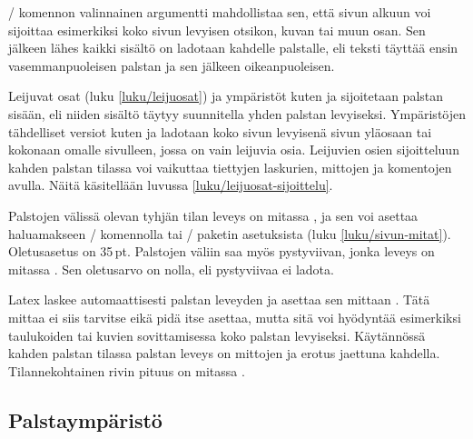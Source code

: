 \begin{koodilohkosis}
\end{koodilohkosis}

\-/ komennon valinnainen argumentti mahdollistaa sen,
että sivun alkuun voi sijoittaa esimerkiksi koko sivun levyisen otsikon,
kuvan tai muun osan. Sen jälkeen lähes kaikki sisältö on ladotaan
kahdelle palstalle, eli teksti täyttää ensin vasemmanpuoleisen palstan
ja sen jälkeen oikeanpuoleisen.

Leijuvat osat (luku \ref{luku/leijuosat}) ja ympäristöt kuten
 ja  sijoitetaan palstan sisään, eli
niiden sisältö täytyy suunnitella yhden palstan levyiseksi. Ympäristöjen
tähdelliset versiot kuten  ja 
ladotaan koko sivun levyisenä sivun yläosaan tai kokonaan omalle
sivulleen, jossa on vain leijuvia osia. Leijuvien osien sijoitteluun
kahden palstan tilassa voi vaikuttaa tiettyjen laskurien, mittojen ja
komentojen avulla. Näitä käsitellään luvussa
\ref{luku/leijuosat-sijoittelu}.

Palstojen välissä olevan tyhjän tilan leveys on mitassa
, ja sen voi asettaa haluamakseen
\-/ komennolla tai \-/ paketin
asetuksista (luku \ref{luku/sivun-mitat}). Oletusasetus on 35\,pt.
Palstojen väliin saa myös pystyviivan, jonka leveys on mitassa
. Sen oletusarvo on nolla, eli pystyviivaa ei
ladota.

\begin{koodilohkosis}
\setlength{\columnsep}{6mm}       %
\setlength{\columnseprule}{.2mm}  %
\end{koodilohkosis}

Latex laskee automaattisesti palstan leveyden ja asettaa sen mittaan
. Tätä mittaa ei siis tarvitse eikä pidä itse
asettaa, mutta sitä voi hyödyntää esimerkiksi taulukoiden tai kuvien
sovittamisessa koko palstan levyiseksi. Käytännössä kahden palstan
tilassa palstan leveys on mittojen  ja
 erotus jaettuna kahdella. Tilannekohtainen rivin
pituus on mitassa .

\subsection{Palstaympäristö}
\label{luku/multicol}

